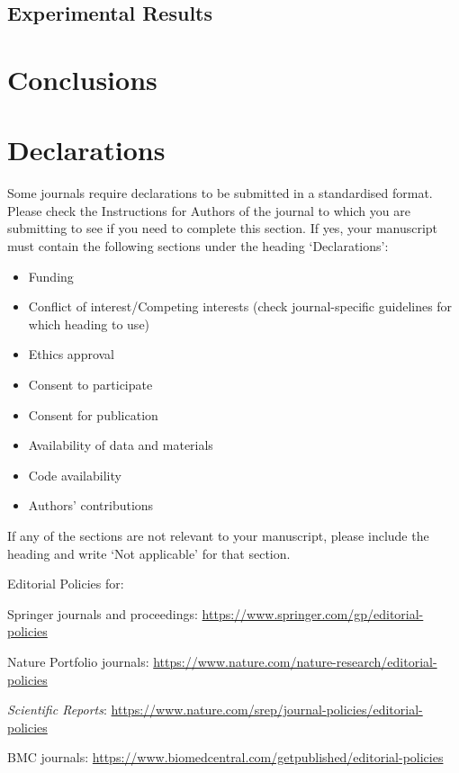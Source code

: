 \documentclass[sn-mathphys]{sn-jnl}
\theoremstyle{thmstyleone}%
\theoremstyle{thmstyletwo}%
\theoremstyle{thmstylethree}%
\begin{document}
\subsection{Experimental Results}

\section{Conclusions}



\section*{Declarations}

Some journals require declarations to be submitted in a standardised format. Please check the Instructions for Authors of the journal to which you are submitting to see if you need to complete this section. If yes, your manuscript must contain the following sections under the heading `Declarations':

\begin{itemize}
\item Funding
\item Conflict of interest/Competing interests (check journal-specific guidelines for which heading to use)
\item Ethics approval 
\item Consent to participate
\item Consent for publication
\item Availability of data and materials
\item Code availability 
\item Authors' contributions
\end{itemize}

\noindent
If any of the sections are not relevant to your manuscript, please include the heading and write `Not applicable' for that section. 

\bigskip
\begin{flushleft}%
Editorial Policies for:

\bigskip\noindent
Springer journals and proceedings: \url{https://www.springer.com/gp/editorial-policies}

\bigskip\noindent
Nature Portfolio journals: \url{https://www.nature.com/nature-research/editorial-policies}

\bigskip\noindent
\textit{Scientific Reports}: \url{https://www.nature.com/srep/journal-policies/editorial-policies}

\bigskip\noindent
BMC journals: \url{https://www.biomedcentral.com/getpublished/editorial-policies}
\end{flushleft}


\end{document}
